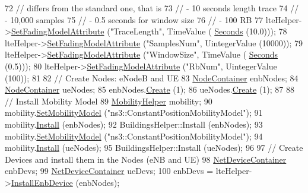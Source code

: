 \begin{DoxyCode}
72   \textcolor{comment}{// differs from the standard one, that is}
73   \textcolor{comment}{// - 10 seconds length trace}
74   \textcolor{comment}{// - 10,000 samples}
75   \textcolor{comment}{// - 0.5 seconds for window size}
76   \textcolor{comment}{// - 100 RB}
77   lteHelper->\hyperlink{classns3_1_1LteHelper_aedbe5aa68544779474f27d32e4470ada}{SetFadingModelAttribute} (\textcolor{stringliteral}{"TraceLength"}, TimeValue (
      \hyperlink{group__timecivil_ga33c34b816f8ff6628e33d5c8e9713b9e}{Seconds} (10.0)));
78   lteHelper->\hyperlink{classns3_1_1LteHelper_aedbe5aa68544779474f27d32e4470ada}{SetFadingModelAttribute} (\textcolor{stringliteral}{"SamplesNum"}, UintegerValue (10000));
79   lteHelper->\hyperlink{classns3_1_1LteHelper_aedbe5aa68544779474f27d32e4470ada}{SetFadingModelAttribute} (\textcolor{stringliteral}{"WindowSize"}, TimeValue (
      \hyperlink{group__timecivil_ga33c34b816f8ff6628e33d5c8e9713b9e}{Seconds} (0.5)));
80   lteHelper->\hyperlink{classns3_1_1LteHelper_aedbe5aa68544779474f27d32e4470ada}{SetFadingModelAttribute} (\textcolor{stringliteral}{"RbNum"}, UintegerValue (100));
81  
82   \textcolor{comment}{// Create Nodes: eNodeB and UE}
83   \hyperlink{classns3_1_1NodeContainer}{NodeContainer} enbNodes;
84   \hyperlink{classns3_1_1NodeContainer}{NodeContainer} ueNodes;
85   enbNodes.\hyperlink{classns3_1_1NodeContainer_a787f059e2813e8b951cc6914d11dfe69}{Create} (1);
86   ueNodes.\hyperlink{classns3_1_1NodeContainer_a787f059e2813e8b951cc6914d11dfe69}{Create} (1);
87 
88   \textcolor{comment}{// Install Mobility Model}
89   \hyperlink{classns3_1_1MobilityHelper}{MobilityHelper} mobility;
90   mobility.\hyperlink{classns3_1_1MobilityHelper_a030275011b6f40682e70534d30280aba}{SetMobilityModel} (\textcolor{stringliteral}{"ns3::ConstantPositionMobilityModel"});
91   mobility.\hyperlink{classns3_1_1MobilityHelper_a07737960ee95c0777109cf2994dd97ae}{Install} (enbNodes);
92   BuildingsHelper::Install (enbNodes);
93   mobility.\hyperlink{classns3_1_1MobilityHelper_a030275011b6f40682e70534d30280aba}{SetMobilityModel} (\textcolor{stringliteral}{"ns3::ConstantPositionMobilityModel"});
94   mobility.\hyperlink{classns3_1_1MobilityHelper_a07737960ee95c0777109cf2994dd97ae}{Install} (ueNodes);
95   BuildingsHelper::Install (ueNodes);
96 
97   \textcolor{comment}{// Create Devices and install them in the Nodes (eNB and UE)}
98   \hyperlink{classns3_1_1NetDeviceContainer}{NetDeviceContainer} enbDevs;
99   \hyperlink{classns3_1_1NetDeviceContainer}{NetDeviceContainer} ueDevs;
100   enbDevs = lteHelper->\hyperlink{classns3_1_1LteHelper_a5e009ad35ef85f46b5a6099263f15a03}{InstallEnbDevice} (enbNodes);

\end{DoxyCode}

